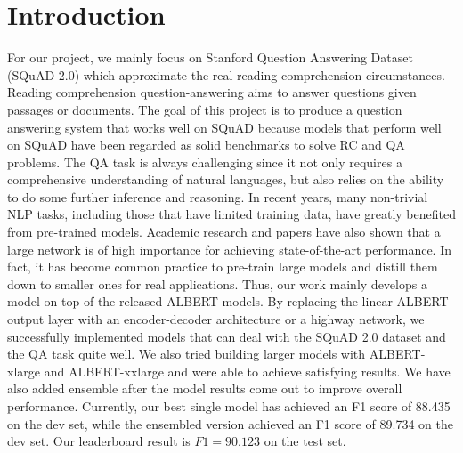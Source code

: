 \documentclass{article}
\begin{document}
\section{Introduction}
For our project, we mainly focus on Stanford Question Answering Dataset (SQuAD 2.0) which approximate the real reading comprehension circumstances. Reading comprehension question-answering aims to answer questions given passages or documents. The goal of this project is to produce a question answering system that works well on SQuAD because models that perform well on SQuAD have been regarded as solid benchmarks to solve RC and QA problems. The QA task is always challenging since it not only requires a comprehensive understanding of natural languages, but also relies on the ability to do some further inference and reasoning. In recent years, many non-trivial NLP tasks, including those that have limited training data, have greatly benefited from pre-trained models. Academic research and papers have also shown that a large network is of high importance for achieving state-of-the-art performance. \citep{bert} \citep{radford} In fact, it has become common practice to pre-train large models and distill them down to smaller ones for real applications. \citep{sun} \citep{turc} Thus, our work mainly develops a model on top of the released ALBERT models. By replacing the linear ALBERT output layer with an encoder-decoder architecture or a highway network, we successfully implemented models that can deal with the SQuAD 2.0 dataset and the QA task quite well. We also tried building larger models with ALBERT-xlarge and ALBERT-xxlarge and were able to achieve satisfying results. We have also added ensemble after the model results come out to improve overall performance. Currently, our best single model has achieved an F1 score of 88.435 on the dev set, while the ensembled version achieved an F1 score of 89.734 on the dev set. Our leaderboard result is $F1 = 90.123$ on the test set.
\end{document}
